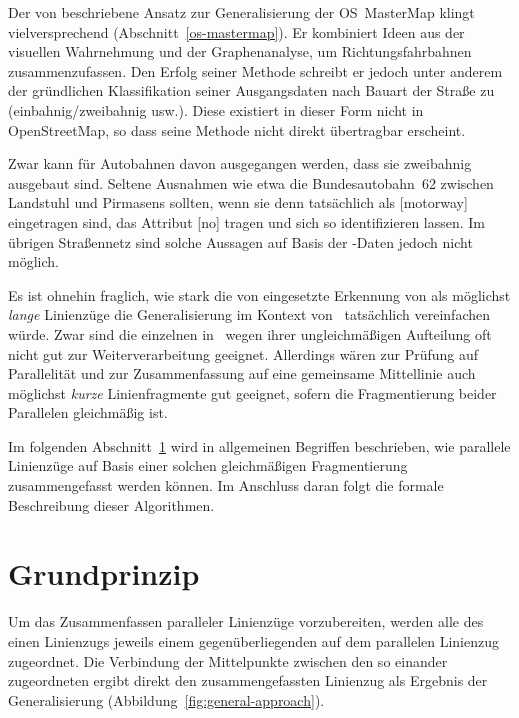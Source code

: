 \documentclass[../main/thesis.tex]{subfiles}
\begin{document}

Der von \citeauthor{Tho05} beschriebene Ansatz zur Generalisierung der OS~MasterMap klingt vielversprechend (Abschnitt~\ref{os-mastermap}).
Er kombiniert Ideen aus der visuellen Wahrnehmung  und der Graphenanalyse, um Richtungsfahrbahnen zusammenzufassen.
Den Erfolg seiner Methode schreibt er jedoch unter anderem der gründlichen Klassifikation seiner Ausgangsdaten nach Bauart der Straße zu (einbahnig/zweibahnig usw.). 
Diese existiert in dieser Form nicht in OpenStreetMap, so dass seine Methode nicht direkt übertragbar erscheint.

Zwar kann für Autobahnen davon ausgegangen werden, dass sie zweibahnig ausgebaut sind.
Seltene Ausnahmen wie etwa die Bundesautobahn~62 zwischen Landstuhl und Pirmasens sollten, wenn sie denn tatsächlich als [motorway] eingetragen sind, das Attribut [no] tragen und sich so identifizieren lassen.
Im übrigen Straßennetz sind solche Aussagen auf Basis der \osm-Daten jedoch nicht möglich.

Es ist ohnehin fraglich, wie stark die von \citeauthor{Tho05} eingesetzte Erkennung von  als möglichst \emph{lange} Linienzüge die Generalisierung im Kontext von \osm\ tatsächlich vereinfachen würde.
Zwar sind die einzelnen  in \osm\ wegen ihrer ungleichmäßigen Aufteilung oft nicht gut zur Weiterverarbeitung geeignet.
Allerdings wären zur Prüfung auf Parallelität und zur Zusammenfassung auf eine gemeinsame Mittellinie auch möglichst \emph{kurze} Linienfragmente gut geeignet, sofern die Fragmentierung beider Parallelen gleichmäßig ist.

Im folgenden Abschnitt~\ref{ch:algorithm-principle} wird in allgemeinen Begriffen beschrieben, wie parallele Linienzüge auf Basis einer solchen gleichmäßigen Fragmentierung zusammengefasst werden können.
Im Anschluss daran folgt die formale Beschreibung dieser Algorithmen.




\section{Grundprinzip}
\label{ch:algorithm-principle}

Um das Zusammenfassen paralleler Linienzüge vorzubereiten, werden alle  des einen Linienzugs jeweils einem gegenüberliegenden  auf dem parallelen Linienzug zugeordnet.
Die Verbindung der Mittelpunkte zwischen den so einander zugeordneten  ergibt direkt den zusammengefassten Linienzug als Ergebnis der Generalisierung (Abbildung~\ref{fig:general-approach}).
\end{document}
